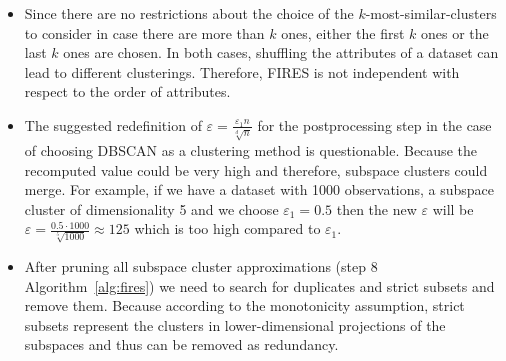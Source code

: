 \begin{itemize}
	\item Since there are no restrictions about the choice of the $k$-most-similar-clusters to consider in case there are more than $k$ ones, either the first $k$ ones or the last $k$ ones are chosen. In both cases, shuffling the attributes of a dataset can lead to different clusterings.  Therefore, FIRES is not independent with respect to the order of attributes.
	\item The suggested redefinition of $\varepsilon =  \frac{\varepsilon_{1}n}{\sqrt[d]{n}}$ for the postprocessing step in the case of choosing DBSCAN as a clustering method is questionable. Because the recomputed value could be very high and therefore, subspace clusters could merge. For example, if we have a dataset with 1000 observations, a subspace cluster of dimensionality 5 and we choose $\varepsilon_{1} = 0.5$ then the new $\varepsilon$ will be $\varepsilon = \frac{0.5 \cdot 1000}{\sqrt[5]{1000}} \approx 125$ which is too high compared to $\varepsilon_{1}$.
	\item After pruning all subspace cluster approximations (step 8 Algorithm~\ref{alg:fires}) we need to search for duplicates and strict subsets and remove them. Because according to the monotonicity assumption, strict subsets represent the clusters in lower-dimensional projections of the subspaces and thus can be removed as redundancy.
\end{itemize}